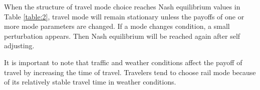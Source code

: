When the structure of travel mode choice reaches Nash equilibrium values in Table \ref{table:2}, travel mode will remain stationary unless the payoffs of one or more mode parameters are changed. If a mode changes condition, a small perturbation appears. Then Nash equilibrium will be reached again after self adjusting.


It is important to note that traffic and weather conditions affect the payoff of travel by increasing the time of travel. Travelers tend to choose rail mode because of its relatively stable travel time in weather conditions.


